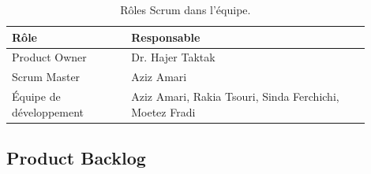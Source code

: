 \documentclass[12pt,a4paper,oneside]{book}
\begin{document}
\begin{table}[H]
\caption{Rôles Scrum dans l'équipe.}
\label{tab:scrumroles}
\centering
\renewcommand{\arraystretch}{1.3}
\begin{tabular}{L{0.30\linewidth} L{0.60\linewidth}}
\toprule
\textbf{Rôle} & \textbf{Responsable} \\
\midrule
Product Owner            & Dr. Hajer Taktak \\
Scrum Master             & Aziz Amari \\
Équipe de développement  & Aziz Amari, Rakia Tsouri, Sinda Ferchichi, Moetez Fradi \\
\bottomrule
\end{tabular}
\end{table}

\subsection{Product Backlog}
\end{document}
